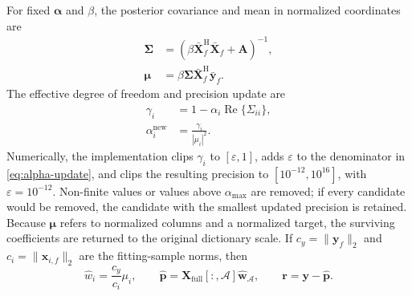 \documentclass[conference]{IEEEtran}
\newcommand{\vect}[1]{\boldsymbol{#1}}
\newcommand{\mat}[1]{\mathbf{#1}}
\newcommand{\herm}{\mathrm{H}}
\begin{document}
For fixed $\vect\alpha$ and $\beta$, the posterior covariance and mean in normalized coordinates are
\begin{align}
 \mat\Sigma&=\left(\beta\bar{\mat X}_f^{\herm}\bar{\mat X}_f+\mat A\right)^{-1},
 \label{eq:sigma}\\
 \vect\mu&=\beta\mat\Sigma\bar{\mat X}_f^{\herm}\bar{\mat y}_f.
 \label{eq:mu}
\end{align}
The effective degree of freedom and precision update are
\begin{align}
 \gamma_i&=1-\alpha_i\operatorname{Re}\{\Sigma_{ii}\}, \label{eq:gamma}\\
 \alpha_i^{\mathrm{new}}&=\frac{\gamma_i}{|\mu_i|^2}. \label{eq:alpha-update}
\end{align}
Numerically, the implementation clips $\gamma_i$ to $[\varepsilon,1]$, adds $\varepsilon$ to the denominator in \eqref{eq:alpha-update}, and clips the resulting precision to $[10^{-12},10^{16}]$, with $\varepsilon=10^{-12}$. Non-finite values or values above $\alpha_{\max}$ are removed; if every candidate would be removed, the candidate with the smallest updated precision is retained. Because $\vect\mu$ refers to normalized columns and a normalized target, the surviving coefficients are returned to the original dictionary scale. If $c_y=\|\mat y_f\|_2$ and $c_i=\|\mat x_{i,f}\|_2$ are the fitting-sample norms, then
\begin{equation}
 \widehat w_i=\frac{c_y}{c_i}\mu_i,\qquad
 \widehat{\mat p}=\mat X_{\mathrm{full}}[:,\mathcal A]
 \widehat{\mat w}_{\mathcal A},\qquad
 \mat r=\mat y-\widehat{\mat p}.
 \label{eq:estimate}
\end{equation}
\end{document}
